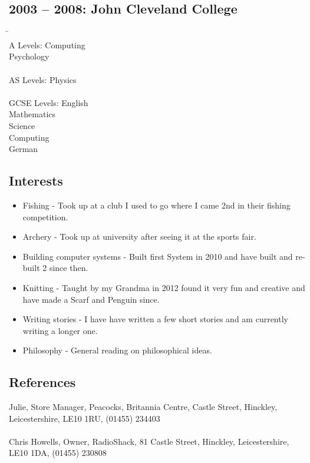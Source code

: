 \documentclass[0pt]{article}
\begin{document}
\subsection*{2003 -- 2008: John Cleveland College}  
\begin{tabbing}
\=~~~~~~~~~~~~~~~~~~~~~~~~\=\\
\> A Levels:  \>Computing \\

\>\>Psychology\\
\\
\> AS Levels: \>Physics \\
\\
\> GCSE Levels: \>English\\

\>\>Mathematics\\

\>\>Science\\

\>\>Computing\\

\>\>German\\
\end{tabbing}

\subsection*{Interests}
\begin{itemize}
	\item Fishing - Took up at a club I used to go where I came 2nd in their fishing competition.
	\item Archery - Took up at university after seeing it at the sports fair.
	\item Building computer systems - Built first System in 2010 and have built and re-built 2 since then.
	\item Knitting - Taught by my Grandma in 2012 found it very fun and creative and have made a Scarf and Penguin since.
	\item Writing stories - I have have written a few short stories and am currently writing a longer one.
	\item Philosophy - General reading on philosophical ideas.
\end{itemize}

\subsection*{References}
Julie, Store Manager, Peacocks, Britannia Centre, Castle Street, Hinckley, Leicestershire, LE10 1RU, 
(01455) 234403
\\\\
Chris Howells, Owner, RadioShack, 81 Castle Street, Hinckley, Leicestershire, LE10 1DA,
(01455) 230808 
\end{document}

